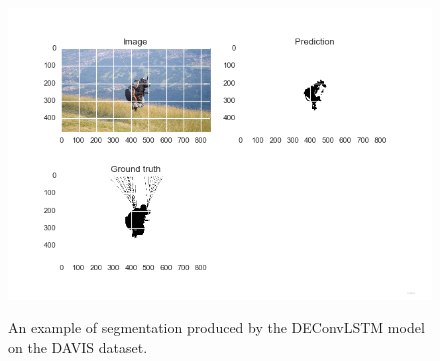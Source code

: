 \begin{table}[t]
    \caption{Results on the Davis dataset. Average Intersection over Union
        (IoU) is reported. We compare to~{\tiny\url{
            https://graphics.ethz.ch/~perazzif/davis/soa_compare.php}},
        where pixel accuracy is not reported.}
    \label{tbl:deconvLSTM_davis}
\end{table}

\begin{figure}[t]
    \centering
    \includegraphics[trim={0 15mm 0 0},width=0.8\columnwidth]{img/deconvLSTM/paragliding-0.png}\\
    \caption{An example of segmentation produced by the DEConvLSTM model on
        the DAVIS dataset.}
    \label{fig:deconvlstm_gatech_sample}
\end{figure}

